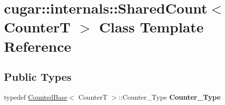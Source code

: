 \hypertarget{classcugar_1_1internals_1_1_shared_count}{}\section{cugar\+:\+:internals\+:\+:Shared\+Count$<$ CounterT $>$ Class Template Reference}
\label{classcugar_1_1internals_1_1_shared_count}
\subsection*{Public Types}
\begin{DoxyCompactItemize}
\item 
\mbox{\label{classcugar_1_1internals_1_1_shared_count_ac76264b3a20dbfabd86f71243f12bced}} 
typedef \hyperlink{classcugar_1_1internals_1_1_counted_base}{Counted\+Base}$<$ CounterT $>$\+::Counter\+\_\+\+Type {\bfseries Counter\+\_\+\+Type}
\end{DoxyCompactItemize}
